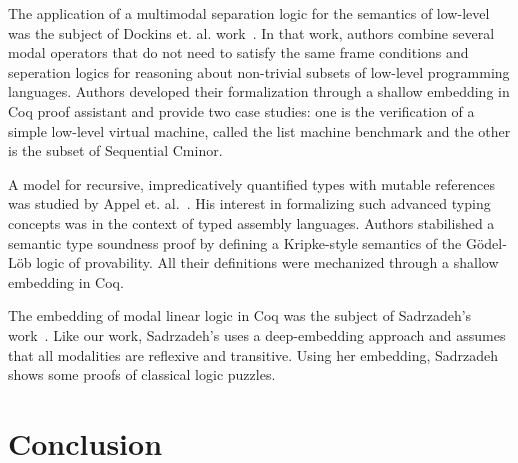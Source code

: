\documentclass[sigconf]{acmart}
\begin{document}
The application of a multimodal separation logic for the semantics of low-level
was the subject of Dockins et. al. work~\cite{Dockins08}. In that work, authors
combine several modal operators that do not need to satisfy the same frame
conditions and seperation logics for reasoning about non-trivial subsets of
low-level programming languages. Authors developed their formalization through a
shallow embedding in Coq proof assistant and provide two case studies: one is
the verification of a simple low-level virtual machine, called the list machine
benchmark and the other is the subset of Sequential Cminor.

A model for recursive, impredicatively quantified types with mutable references
was studied by Appel et. al.~\cite{Appel07}. His interest in formalizing such
advanced typing concepts was in the context of typed assembly languages.
Authors stabilished a semantic type soundness proof by defining a Kripke-style 
semantics of the G\"odel-L\"ob logic of provability. All their definitions were
mechanized through a shallow embedding in Coq.

The embedding of modal linear logic in Coq was the subject of
Sadrzadeh's work~\cite{Soton03}. Like our work, Sadrzadeh's uses a
deep-embedding approach and assumes that all modalities are reflexive
and transitive. Using her embedding, Sadrzadeh shows some proofs of classical
logic puzzles.

\section{Conclusion}\label{sec:conclusion}





\end{document}
